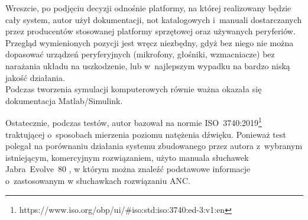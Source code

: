 Wreszcie, po podjęciu decyzji odnośnie platformy, na której realizowany będzie cały system, autor użył dokumentacji, not katalogowych i~manuali dostarczanych przez producentów stosowanej platformy sprzętowej oraz używanych peryferiów. Przegląd wymienionych pozycji jest wręcz niezbędny, gdyż bez niego nie można dopasować urządzeń peryferyjnych (mikrofony, głośniki, wzmacniacze) bez narażania układu na uszkodzenie, lub w~najlepszym wypadku na bardzo niską jakość działania.\\
Podczas tworzenia symulacji komputerowych równie ważna okazała się dokumentacja Matlab/Simulink. 

Ostatecznie, podczas testów, autor bazował na normie ISO~3740:2019\footnote{https://www.iso.org/obp/ui/\#iso:std:iso:3740:ed-3:v1:en} traktującej o~sposobach mierzenia poziomu natężenia dźwięku. Ponieważ test polegał na porównaniu działania systemu zbudowanego przez autora z~wybranym istniejącym, komercyjnym rozwiązaniem, użyto manuala słuchawek Jabra~Evolve~80 \cite{JabraEvolve80}, w którym można znaleźć podstawowe informacje o~zastosowanym w słuchawkach rozwiązaniu ANC.